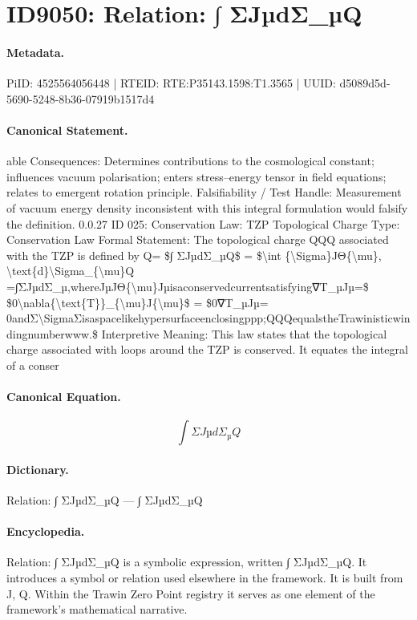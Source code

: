 \section*{ID9050: Relation: ∫ ΣJµdΣ\_µQ}
\paragraph{Metadata.}
PiID: 4525564056448 | RTEID: RTE:P35143.1598:T1.3565 | UUID: d5089d5d-5690-5248-8b36-07919b1517d4

\paragraph{Canonical Statement.}
able Consequences: Determines contributions to the cosmological constant; influences vacuum polarisation; enters stress–energy tensor in field equations; relates to emergent rotation principle. Falsifiability / Test Handle: Measurement of vacuum energy density inconsistent with this integral formulation would falsify the definition. 0.0.27 ID 025: Conservation Law: TZP Topological Charge Type: Conservation Law Formal Statement: The topological charge QQQ associated with the TZP is defined by Q= \$∫ ΣJµdΣ\_µQ\$ = \$\textbackslash{}int \{\textbackslash{}Sigma\}JΘ\{\textbackslash{}mu\}, \textbackslash{}text\{d\}\textbackslash{}Sigma\_\{\textbackslash{}mu\}Q =∫ΣJµdΣ\_µ,whereJµJΘ\{\textbackslash{}mu\}Jµisaconservedcurrentsatisfying∇T\_µJµ=\$ \$0\textbackslash{}nabla\{\textbackslash{}text\{T\}\}\_\{\textbackslash{}mu\}J\{\textbackslash{}mu\}\$ = \$0∇T\_µJµ= 0andΣ\textbackslash{}SigmaΣisaspacelikehypersurfaceenclosingppp;QQQequalstheTrawinisticwindingnumberwww.\$ Interpretive Meaning: This law states that the topological charge associated with loops around the TZP is conserved. It equates the integral of a conser

\paragraph{Canonical Equation.}
\[
∫ ΣJµdΣ_µQ
\]

\paragraph{Dictionary.}
Relation: ∫ ΣJµdΣ\_µQ — ∫ ΣJµdΣ\_µQ

\paragraph{Encyclopedia.}
Relation: ∫ ΣJµdΣ\_µQ is a symbolic expression, written ∫ ΣJµdΣ\_µQ. It introduces a symbol or relation used elsewhere in the framework. It is built from J, Q. Within the Trawin Zero Point registry it serves as one element of the framework's mathematical narrative.
